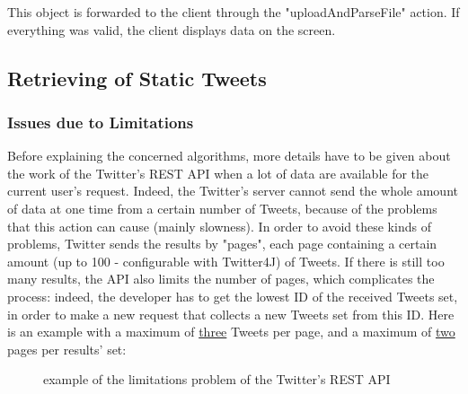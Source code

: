 \documentclass[a4paper,11pt]{report}
\begin{document}
This object is forwarded to the client through the "uploadAndParseFile" action. If everything was valid, the client displays data on the screen.
\newpage

\subsection{Retrieving of Static Tweets}
\subsubsection{Issues due to Limitations}
Before explaining the concerned algorithms, more details have to be given about the work of the Twitter's REST API when a lot of data are available for the current user's request. Indeed, the Twitter's server cannot send the whole amount of data at one time from a certain number of Tweets, because of the problems that this action can cause (mainly slowness). In order to avoid these kinds of problems, Twitter sends the results by "pages", each page containing a certain amount (up to 100 - configurable with Twitter4J) of Tweets. If there is still too many results, the API also limits the number of pages, which complicates the process: indeed, the developer has to get the lowest ID of the received Tweets set, in order to make a new request that collects a new Tweets set from this ID. Here is an example with a maximum of \underline{three} Tweets per page, and a maximum of \underline{two} pages per results' set:
\begin{figure}[H]
\vspace{-5pt}
\begin{center}
\vspace{-5pt}
\caption{example of the limitations problem of the Twitter's REST API}
\end{center}
\end{figure}
\end{document}
